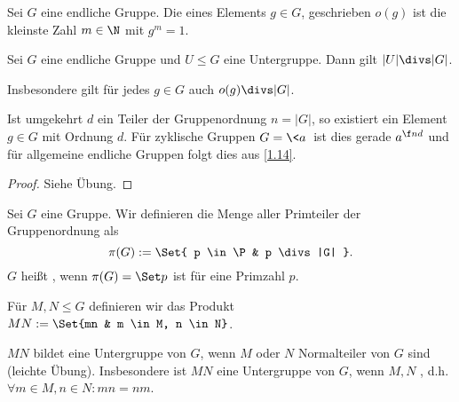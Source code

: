 \begin{df*}
	Sei $G$ eine endliche Gruppe.
	Die  eines Elements $g \in G$, geschrieben $o(g)$ ist die kleinste Zahl $m \in \N$ mit $g^m = 1$.
\end{df*}

\begin{st}[Lagrange] \label{2.2}
	Sei $G$ eine endliche Gruppe und $U \le G$ eine Untergruppe.
	Dann gilt $|U| \divs |G|$.

	Insbesondere gilt für jedes $g \in G$ auch $o(g) \divs |G|$.
	\begin{note}
		Ist umgekehrt $d$ ein Teiler der Gruppenordnung $n = |G|$, so existiert ein Element $g \in G$ mit Ordnung $d$.
		Für zyklische Gruppen $G = \<a\>$ ist dies gerade $a^{\f nd}$ und für allgemeine endliche Gruppen folgt dies aus \ref{1.14}.
	\end{note}
	\begin{proof}
		Siehe Übung.
	\end{proof}
\end{st}

\begin{df*}
	Sei $G$ eine Gruppe.
	Wir definieren die Menge aller Primteiler der Gruppenordnung als
	\[
		\pi(G) := \Set{ p \in \P & p \divs |G| }.
	\]
	$G$ heißt , wenn $\pi(G) = \Set p$ ist für eine Primzahl $p$.

	Für $M, N \le G$ definieren wir das Produkt $MN := \Set{mn & m \in M, n \in N}$.
	\begin{note}
		$MN$ bildet eine Untergruppe von $G$, wenn $M$ oder $N$ Normalteiler von $G$ sind (leichte Übung).
		Insbesondere ist $MN$ eine Untergruppe von $G$, wenn $M, N$ , d.h. $\forall m \in M, n \in N : mn = nm$.
	\end{note}
\end{df*}


